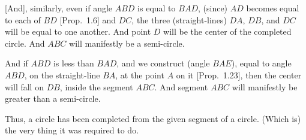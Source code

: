 \begin{Parallel}{}{}
{\epsfysize=1.3in
\centerline{}
 
\mbox{[}And], similarly, even if angle $ABD$ is equal to $BAD$,  (since) $AD$ becomes equal to
 each of $BD$ [Prop.~1.6] and $DC$, the three (straight-lines) $DA$, $DB$, and $DC$
 will  be equal to one another. And point $D$ will be the center of the completed
 circle. And $ABC$ will manifestly be a semi-circle.
 
 And if $ABD$ is less than $BAD$, and we construct (angle $BAE$), equal to angle
 $ABD$,  on the straight-line $BA$, at the point $A$ on it [Prop.~1.23], then
 the center will fall on $DB$,  inside the segment $ABC$. And segment
 $ABC$ will manifestly be greater than a semi-circle.
 
 Thus, a circle has been completed from the given segment of a circle. (Which is) the very thing it was required to do.}
\end{Parallel}

